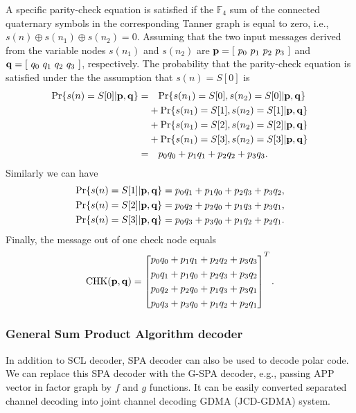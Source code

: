 A specific parity-check equation is satisfied if the $\mathbb{F}_4$ sum of the connected quaternary symbols in the corresponding Tanner graph is equal to zero, i.e., $s(n) \oplus s(n_1) \oplus s(n_2) = 0$. Assuming that the two input messages derived from the variable nodes $s(n_1)$ and $s(n_2)$ are ${\bf p} = [ \ p_0 \ p_1 \ p_2 \ p_3 \ ]$ and ${\bf q} = [ \ q_0 \ q_1 \ q_2 \ q_3 \ ]$, respectively. The probability that the parity-check equation is satisfied under the the assumption that $s(n)=S[0]$ is
\begin{align}
 \text{Pr}\{s(n)=S[0]|{\bf p}, {\bf q}\} = & \quad \text{Pr}\{s(n_1)=S[0], s(n_2)=S[0]|{\bf p}, {\bf q}\} \nonumber \\
 & + \text{Pr}\{s(n_1)=S[1], s(n_2)=S[1]|{\bf p}, {\bf q}\} \nonumber \\
 & + \text{Pr}\{s(n_1)=S[2], s(n_2)=S[2]|{\bf p}, {\bf q}\} \nonumber \\
 & + \text{Pr}\{s(n_1)=S[3], s(n_2)=S[3]|{\bf p}, {\bf q}\} \nonumber \\
 = & \quad p_0 q_0 + p_1 q_1 + p_2 q_2 + p_3 q_3.
\end{align}
Similarly we can have
\begin{align}
 \text{Pr}\{s(n)=S[1]|{\bf p}, {\bf q}\} & = p_0 q_1 + p_1 q_0 + p_2 q_3 + p_3 q_2, \nonumber \\
 \text{Pr}\{s(n)=S[2]|{\bf p}, {\bf q}\} & = p_0 q_2 + p_2 q_0 + p_1 q_3 + p_3 q_1, \nonumber \\
 \text{Pr}\{s(n)=S[3]|{\bf p}, {\bf q}\} & = p_0 q_3 + p_3 q_0 + p_1 q_2 + p_2 q_1.
\end{align}
Finally, the message out of one check node equals
\begin{equation}
 \text{CHK}({\bf p},{\bf q})= \left[
 \begin{split}
  &p_0 q_0 + p_1 q_1 + p_2 q_2 + p_3 q_3 \\
  &p_0 q_1 + p_1 q_0 + p_2 q_3 + p_3 q_2 \\
  &p_0 q_2 + p_2 q_0 + p_1 q_3 + p_3 q_1 \\
  &p_0 q_3 + p_3 q_0 + p_1 q_2 + p_2 q_1
 \end{split}
 \right]^T.
\end{equation}


\subsubsection{General Sum Product Algorithm decoder}


	In addition to SCL decoder, SPA decoder can also be used to decode polar code. We can replace this SPA decoder with the G-SPA decoder, e.g., passing APP vector in factor graph by $f$ and $g$ functions. It can be easily converted separated channel decoding into joint channel decoding GDMA (JCD-GDMA) system.  
	
